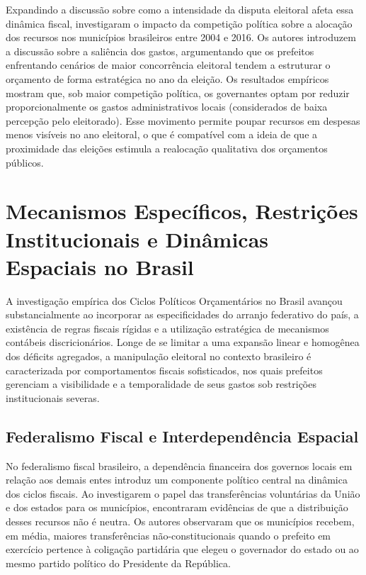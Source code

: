 Expandindo a discussão sobre como a intensidade da disputa eleitoral afeta essa dinâmica fiscal, \textcite{teixeira2021} investigaram o impacto da competição política sobre a alocação dos recursos nos municípios brasileiros entre 2004 e 2016. Os autores introduzem a discussão sobre a saliência dos gastos, argumentando que os prefeitos enfrentando cenários de maior concorrência eleitoral tendem a estruturar o orçamento de forma estratégica no ano da eleição. Os resultados empíricos mostram que, sob maior competição política, os governantes optam por reduzir proporcionalmente os gastos administrativos locais (considerados de baixa percepção pelo eleitorado). Esse movimento permite poupar recursos em despesas menos visíveis no ano eleitoral, o que é compatível com a ideia de que a proximidade das eleições estimula a realocação qualitativa dos orçamentos públicos.

\chapter{Mecanismos Específicos, Restrições Institucionais e Dinâmicas Espaciais no Brasil}\label{cap:mecanismos}

A investigação empírica dos Ciclos Políticos Orçamentários no Brasil avançou substancialmente ao incorporar as especificidades do arranjo federativo do país, a existência de regras fiscais rígidas e a utilização estratégica de mecanismos contábeis discricionários. Longe de se limitar a uma expansão linear e homogênea dos déficits agregados, a manipulação eleitoral no contexto brasileiro é caracterizada por comportamentos fiscais sofisticados, nos quais prefeitos gerenciam a visibilidade e a temporalidade de seus gastos sob restrições institucionais severas.

\section{Federalismo Fiscal e Interdependência Espacial}

No federalismo fiscal brasileiro, a dependência financeira dos governos locais em relação aos demais entes introduz um componente político central na dinâmica dos ciclos fiscais. Ao investigarem o papel das transferências voluntárias da União e dos estados para os municípios, \textcite{ferreira2007} encontraram evidências de que a distribuição desses recursos não é neutra. Os autores observaram que os municípios recebem, em média, maiores transferências não-constitucionais quando o prefeito em exercício pertence à coligação partidária que elegeu o governador do estado ou ao mesmo partido político do Presidente da República.

